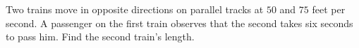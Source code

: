 Two trains move in opposite directions on parallel tracks at $50$ and $75$ feet per second. A passenger on the first train observes that the second takes six seconds to pass him. Find the second train's length.
